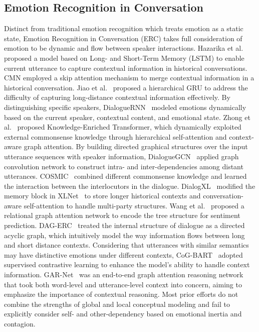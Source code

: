 \documentclass{SCIS2019}
\begin{document}
\subsection{Emotion Recognition in Conversation}
Distinct from traditional emotion recognition which treats emotion as a static state, Emotion Recognition in Conversation (ERC) takes full consideration of emotion to be dynamic and flow between speaker interactions. Hazarika et al. \cite{hazarika2018icon} proposed a model based on Long- and Short-Term Memory (LSTM) to enable current utterance to capture contextual information in historical conversations. CMN \cite{hazarika2018conversational} employed a skip attention mechanism to merge contextual information in a historical conversation. Jiao et al.~\cite{jiao2019higru} proposed a hierarchical GRU to address the difficulty of capturing long-distance contextual information effectively. By distinguishing specific speakers, DialogueRNN~\cite{majumder2019dialoguernn} modeled emotions dynamically based on the current speaker, contextual content, and emotional state. Zhong et al.~\cite{zhong2019knowledge} proposed Knowledge-Enriched Transformer, which dynamically exploited external commonsense knowledge through hierarchical self-attention and context-aware graph attention. By building directed graphical structures over the input utterance sequences with speaker information, DialogueGCN~\cite{ghosal2019dialoguegcn} applied graph convolution network to construct intra- and inter-dependencies among distant utterances. COSMIC~\cite{Ghosal2020} combined different commonsense knowledge and learned the interaction between the interlocutors in the dialogue. DialogXL~\cite{shen2021dialogxl} modified the memory block in XLNet~\cite{yang2019xlnet} to store longer historical contexts and conversation-aware self-attention to handle multi-party structures. Wang et al.~\cite{wang2020relational} proposed a relational graph attention network to encode the tree structure for sentiment prediction. DAG-ERC~\cite{shen-etal-2021-directed} treated the internal structure of dialogue as a directed acyclic graph, which intuitively model the way information flows between long and short distance contexts. Considering that utterances with similar semantics may have distinctive emotions under different contexts, CoG-BART~\cite{li2022contrast} adopted supervised contrastive learning to enhance the model's ability to handle context information. GAR-Net~\cite{xu2022gar} was an end-to-end graph attention reasoning network that took both word-level and utterance-level context into concern, aiming to emphasize the importance of contextual reasoning. Most prior efforts do not combine the strengths of global and local conceptual modeling and fail to explicitly consider self- and other-dependency based on emotional inertia and contagion.
\end{document}
